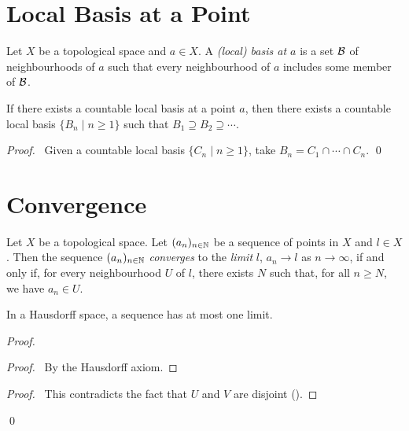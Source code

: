 \section{Local Basis at a Point}

\begin{definition}
    Let $X$ be a topological space and $a \in X$. A \emph{(local) basis at $a$} is a set $\mathcal{B}$ of neighbourhoods of $a$ such that every neighbourhood of $a$ includes some
    member of $\mathcal{B}$.
\end{definition}

\begin{lemma}
    \label{lemma:countable_local_basis}
    If there exists a countable local basis at a point $a$, then there exists a countable local basis $\{ B_n \mid n \geq 1 \}$ such that $B_1 \supseteq B_2 \supseteq \cdots$. 
\end{lemma}

\begin{proof}
    \pf\ Given a countable local basis $\{ C_n \mid n \geq 1 \}$, take $B_n = C_1 \cap \cdots \cap C_n$. \qed
\end{proof}

\section{Convergence}

\begin{definition}[Convergence]
    Let $X$ be a topological space. Let $(a_n)_{n \in \mathbb{N}}$ be a sequence of points in $X$ and $l \in X$.
    Then the sequence $(a_n)_{n \in \mathbb{N}}$ \emph{converges} to the \emph{limit} $l$, $a_n \rightarrow l$ as $n \rightarrow
    \infty$, if and only if, for every neighbourhood $U$ of $l$, there exists $N$ such that, for all
    $n \geq N$, we have $a_n \in U$.
\end{definition}

\begin{theorem}
    In a Hausdorff space, a sequence has at most one limit.
\end{theorem}

\begin{proof}
    \pf
    \begin{proof}
        \pf\ By the Hausdorff axiom.
    \end{proof}
    \qedstep
    \begin{proof}
        \pf\ This contradicts the fact that $U$ and $V$ are disjoint ().
    \end{proof}
    \qed
\end{proof}

